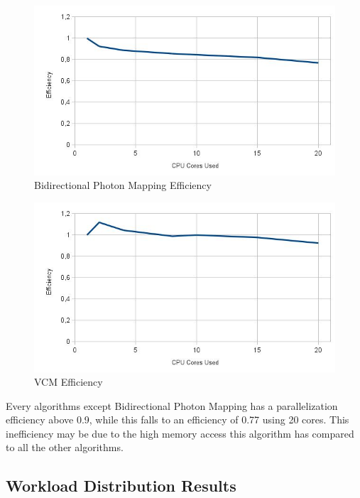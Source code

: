 \begin{figure}[H]
\includegraphics[width=\linewidth]{img/bpmEff.jpg}
\caption{\label{img:bpmEff} Bidirectional Photon Mapping Efficiency}
\end{figure}

\begin{figure}[H]
\includegraphics[width=\linewidth]{img/vcmEff.jpg}
\caption{\label{img:vcmEff} VCM Efficiency}
\end{figure}

Every algorithms except Bidirectional Photon Mapping has a parallelization efficiency above 0.9, while this falls to an efficiency of 0.77 using 20 cores. This inefficiency may be due to the high memory access this algorithm has compared to all the other algorithms.

\subsection{Workload Distribution Results}

